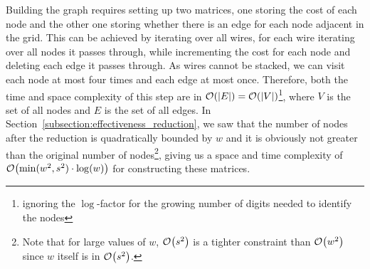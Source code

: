 \documentclass[sigconf,nonacm,screen]{acmart}
\begin{document}


Building the graph requires setting up two matrices, one storing the cost of each node and the other one storing whether there is an edge for each node adjacent in the grid. This can be achieved by iterating over all wires, for each wire iterating over all nodes it passes through, while incrementing the cost for each node and deleting each edge it passes through. As wires cannot be stacked, we can visit each node at most four times and each edge at most once.  Therefore, both the time and space complexity of this step are in $\mathcal{O}\hspace{-0.15em}\left(|E|\right)=\mathcal{O}\hspace{-0.15em}\left(|V|\right)$\footnote{ignoring the $\log$-factor for the growing number of digits needed to identify the nodes}, where $V$ is the set of all nodes and $E$ is the set of all edges. In Section~\ref{subsection:effectiveness_reduction}, we saw that the number of nodes after the reduction is quadratically bounded by $w$ and it is obviously not greater than the original number of nodes\footnote{Note that for large values of $w$, $\mathcal{O}\hspace{-0.15em}\left(s^2\right)$ is a tighter constraint than $\mathcal{O}\hspace{-0.15em}\left(w^2\right)$ since $w$ itself is in $\mathcal{O}\hspace{-0.15em}\left(s^2\right)$.}, giving us a space and time complexity of $\mathcal{O}\hspace{-0.15em}\left(\min(w^2,s^2)\cdot\log(w)\right)$ for constructing these matrices.
\end{document}

